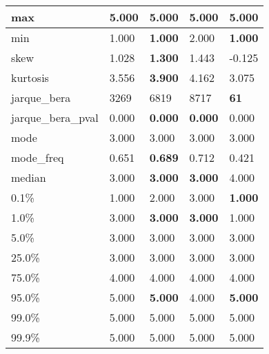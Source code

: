\begin{table}[H]
\begin{tabular}{|l|m{10em}|m{10em}|m{10em}|m{10em}|}
\hline max & 5.000 & 5.000 & 5.000 & 5.000 \\
\hline min & 1.000 & \bfseries 1.000 & \cellcolor[rgb]{0.9, 0.54, 0.52} 2.000 & \bfseries 1.000 \\
\hline skew & 1.028 & \bfseries 1.300 & 1.443 & \cellcolor[rgb]{0.9, 0.54, 0.52} -0.125 \\
\hline kurtosis & 3.556 & \bfseries 3.900 & \cellcolor[rgb]{0.9, 0.54, 0.52} 4.162 & 3.075 \\
\hline jarque\_bera & 3269 & 6819 & \cellcolor[rgb]{0.9, 0.54, 0.52} 8717 & \bfseries 61 \\
\hline jarque\_bera\_pval & 0.000 & \bfseries 0.000 & \bfseries 0.000 & \cellcolor[rgb]{0.9, 0.54, 0.52} 0.000 \\
\hline mode & 3.000 & 3.000 & 3.000 & 3.000 \\
\hline mode\_freq & 0.651 & \bfseries 0.689 & 0.712 & \cellcolor[rgb]{0.9, 0.54, 0.52} 0.421 \\
\hline median & 3.000 & \bfseries 3.000 & \bfseries 3.000 & \cellcolor[rgb]{0.9, 0.54, 0.52} 4.000 \\
\hline 0.1\% & 1.000 & 2.000 & \cellcolor[rgb]{0.9, 0.54, 0.52} 3.000 & \bfseries 1.000 \\
\hline 1.0\% & 3.000 & \bfseries 3.000 & \bfseries 3.000 & \cellcolor[rgb]{0.9, 0.54, 0.52} 1.000 \\
\hline 5.0\% & 3.000 & 3.000 & 3.000 & 3.000 \\
\hline 25.0\% & 3.000 & 3.000 & 3.000 & 3.000 \\
\hline 75.0\% & 4.000 & 4.000 & 4.000 & 4.000 \\
\hline 95.0\% & 5.000 & \bfseries 5.000 & \cellcolor[rgb]{0.9, 0.54, 0.52} 4.000 & \bfseries 5.000 \\
\hline 99.0\% & 5.000 & 5.000 & 5.000 & 5.000 \\
\hline 99.9\% & 5.000 & 5.000 & 5.000 & 5.000 \\
\hline
\end{tabular}
\end{table}
